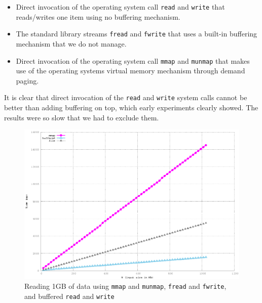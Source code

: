 \documentclass[twoside,11pt,openright]{report}
\begin{document}
\begin{itemize}
	\item Direct invocation of the operating system call \texttt{read} and \texttt{write} that reads/writes one item using no buffering mechanism.
	\item The standard library streams \texttt{fread} and \texttt{fwrite} that uses a built-in buffering mechanism that we do not manage.
	\item Direct invocation of the operating system call \texttt{mmap} and \texttt{munmap} that makes use of the operating systems virtual memory mechanism through demand paging.
\end{itemize}

It is clear that direct invocation of the \texttt{read} and \texttt{write} system calls cannot be better than adding buffering on top, which early experiments clearly showed. The results were so slow that we had to exclude them.

\begin{figure}
  \centering
  \includegraphics[width=\linewidth]{../src/experiments/stream_input_speed_experiment_results/2016-04-23.11_05_51/timems}
  \caption{Reading 1GB of data using \texttt{mmap} and \texttt{munmap}, \texttt{fread} and \texttt{fwrite}, and buffered \texttt{read} and \texttt{write}}
  \label{fig:stream_input_speed}
\end{figure}
\end{document}
